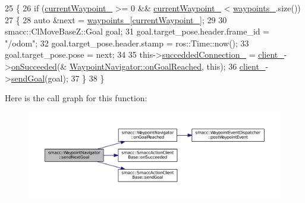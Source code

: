 \begin{DoxyCode}
25 \{
26   \textcolor{keywordflow}{if} (\hyperlink{classsmacc_1_1WaypointNavigator_a9a0102946593081338f7bd259f4670bc}{currentWaypoint\_} >= 0 && \hyperlink{classsmacc_1_1WaypointNavigator_a9a0102946593081338f7bd259f4670bc}{currentWaypoint\_} < 
      \hyperlink{classsmacc_1_1WaypointNavigator_a59d691f2177430c407b8e27df07552e9}{waypoints\_}.size())
27   \{
28     \textcolor{keyword}{auto} &next = \hyperlink{classsmacc_1_1WaypointNavigator_a59d691f2177430c407b8e27df07552e9}{waypoints\_}[\hyperlink{classsmacc_1_1WaypointNavigator_a9a0102946593081338f7bd259f4670bc}{currentWaypoint\_}];
29 
30     smacc::ClMoveBaseZ::Goal goal;
31     goal.target\_pose.header.frame\_id = \textcolor{stringliteral}{"/odom"};
32     goal.target\_pose.header.stamp = ros::Time::now();
33     goal.target\_pose.pose = next;
34 
35     this->\hyperlink{classsmacc_1_1WaypointNavigator_a932d5378c3ef5bd4e8e3152ac657112f}{succeddedConnection\_} = \hyperlink{classsmacc_1_1WaypointNavigator_a2bdb0d4aea851d877fcb20e6d0897bb8}{client\_}->\hyperlink{classsmacc_1_1SmaccActionClientBase_ae84ce50f0bdd42c5d32a631b4e9b8b6a}{onSucceeded}(&
      \hyperlink{classsmacc_1_1WaypointNavigator_ae60d62eec927560048258a4b8f355506}{WaypointNavigator::onGoalReached}, \textcolor{keyword}{this});
36     \hyperlink{classsmacc_1_1WaypointNavigator_a2bdb0d4aea851d877fcb20e6d0897bb8}{client\_}->\hyperlink{classsmacc_1_1SmaccActionClientBase_a58c67a87c5fb8ea1633573c58fe3eee1}{sendGoal}(goal);
37   \}
38 \}
\end{DoxyCode}


Here is the call graph for this function\+:
\nopagebreak
\begin{figure}[H]
\begin{center}
\leavevmode
\includegraphics[width=350pt]{classsmacc_1_1WaypointNavigator_a127438f90a00e98628ebd64b4c84b0b7_cgraph}
\end{center}
\end{figure}


